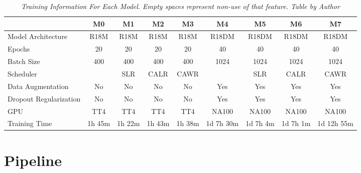 \begin{landscape}

  \begin{table}
    \centering
    \begin{tabular}{lcccccccc}
      \toprule
      & \textbf{M0} & \textbf{M1} & \textbf{M2} & \textbf{M3} & \textbf{M4} & \textbf{M5} & \textbf{M6} & \textbf{M7} \\
      \midrule
      Model Architecture & R18M & R18M & R18M & R18M & R18DM & R18DM & R18DM & R18DM \\
      Epochs & 20 & 20 & 20 & 20 & 40 & 40 & 40 & 40 \\
      Batch Size & 400 & 400 & 400 & 400 & 1024 & 1024 & 1024 & 1024 \\
      Scheduler & & SLR & CALR & CAWR &  & SLR & CALR & CAWR  \\
      Data Augmentation & No & No & No & No  & Yes & Yes & Yes & Yes \\
      Dropout Regularization & No & No & No & No  & Yes & Yes & Yes & Yes \\
      GPU & TT4 & TT4 & TT4 & TT4 & NA100 & NA100 & NA100 & NA100 \\
      Training Time & 1h 45m & 1h 22m & 1h 43m & 1h 38m & 1d 7h 30m & 1d 7h 4m & 1d 7h 1m & 1d 12h 55m \\ \bottomrule
    \end{tabular}
    \caption[Training Information For Each Model.]
    {\textit{Training Information For Each Model. Empty spaces represent non-use of that feature.
    Table by Author}}
    {\label{table:trained-models-information}}
  \end{table}
\end{landscape}

\newpage

\section{Pipeline}

